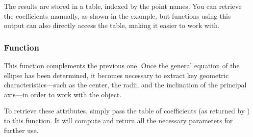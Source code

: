 The results are stored in a table, indexed by the point names. You can retrieve the coefficients manually, as shown in the example, but functions using this output can also directly access the table, making it easier to work with.

\vspace{1em}

\begin{tkzexample}[latex=.35\textwidth]
\end{tkzexample}

\subsubsection{Function }
\label{ssub:function_ellipse_axes_angle}

This function complements the previous one.
Once the general equation of the ellipse has been determined, it becomes necessary to extract key geometric characteristics—such as the center, the radii, and the inclination of the principal axis—in order to work with the  object.

To retrieve these attributes, simply pass the table of coefficients (as returned by ) to this function.
It will compute and return all the necessary parameters for further use.

\vspace{1em}

